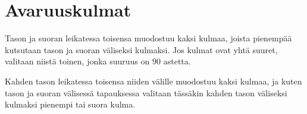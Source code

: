 \section*{Avaruuskulmat}

Tason ja suoran leikatessa toisensa muodostuu kaksi kulmaa, joista pienempää kutsutaan tason ja suoran väliseksi kulmaksi. Jos kulmat ovat yhtä suuret, valitaan niistä toinen, jonka suuruus on 90 astetta. %

Kahden tason leikatessa toisensa niiden välille muodostuu kaksi kulmaa, ja kuten tason ja suoran välisessä tapauksessa valitaan tässäkin kahden tason väliseksi kulmaksi pienempi tai suora kulma.